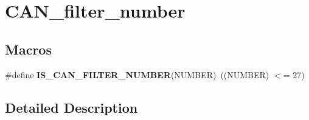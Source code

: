 \hypertarget{group___c_a_n__filter__number}{}\section{C\+A\+N\+\_\+filter\+\_\+number}
\label{group___c_a_n__filter__number}
\subsection*{Macros}
\begin{DoxyCompactItemize}
\item 
\hypertarget{group___c_a_n__filter__number_ga28d6c98a160d71059ed9a5973de2a4ef}{}\#define {\bfseries I\+S\+\_\+\+C\+A\+N\+\_\+\+F\+I\+L\+T\+E\+R\+\_\+\+N\+U\+M\+B\+E\+R}(N\+U\+M\+B\+E\+R)~((N\+U\+M\+B\+E\+R) $<$= 27)\label{group___c_a_n__filter__number_ga28d6c98a160d71059ed9a5973de2a4ef}

\end{DoxyCompactItemize}


\subsection{Detailed Description}
